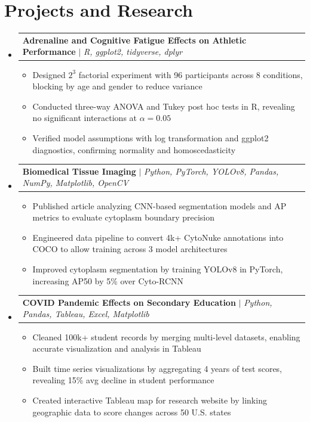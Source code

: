 \documentclass[letterpaper,11pt]{article}
\makeatletter
\newcommand{\resumeItem}[1]{\item\small{#1}}
\newcommand{\resumeProjectHeading}[2]{
    \item
    \begin{tabular*}{\textwidth}{l@{\extracolsep{\fill}}r}
      #1 & #2 \\
    \end{tabular*}\vspace{-7pt}
}
\newcommand{\resumeSubHeadingListStart}{\begin{itemize}[leftmargin=0in, label={}]}
\newcommand{\resumeSubHeadingListEnd}{\end{itemize}}
\newcommand{\resumeItemListStart}{\begin{itemize}[itemsep= 1.5pt, parsep=0pt]}
\newcommand{\resumeItemListEnd}{\end{itemize}\vspace{-5pt}}
\makeatother
\begin{document}
\section{Projects and Research}
    \resumeSubHeadingListStart
      \resumeProjectHeading
          {\textbf{Adrenaline and Cognitive Fatigue Effects on Athletic Performance} $|$ \textit{R, ggplot2, tidyverse, dplyr}}{}
          \resumeItemListStart
            \resumeItem{Designed $2^3$ factorial experiment with 96 participants across 8 conditions, blocking by age and gender to reduce variance}
            \resumeItem{Conducted three-way ANOVA and Tukey post hoc tests in R, revealing no significant interactions at $\alpha = 0.05$}
            \resumeItem{Verified model assumptions with log transformation and ggplot2 diagnostics, confirming normality and homoscedasticity}
          \resumeItemListEnd
      \resumeProjectHeading
          {\textbf{Biomedical Tissue Imaging} $|$ \textit{Python, PyTorch, YOLOv8, Pandas, NumPy, Matplotlib, OpenCV}}{}
          \resumeItemListStart
            \resumeItem{Published article analyzing CNN-based segmentation models and AP metrics to evaluate cytoplasm boundary precision}
            \resumeItem{Engineered data pipeline to convert 4k+ CytoNuke annotations into COCO to allow training across 3 model architectures}
            \resumeItem{Improved cytoplasm segmentation by training YOLOv8 in PyTorch, increasing AP50 by 5\% over Cyto-RCNN}
          \resumeItemListEnd
      \resumeProjectHeading
          {\textbf{COVID Pandemic Effects on Secondary Education} $|$ \textit{Python, Pandas, Tableau, Excel, Matplotlib}}{}
          \resumeItemListStart
            \resumeItem{Cleaned 100k+ student records by merging multi-level datasets, enabling accurate visualization and analysis in Tableau}
            \resumeItem{Built time series visualizations by aggregating 4 years of test scores, revealing 15\% avg decline in student performance}
            \resumeItem{Created interactive Tableau map for research website by linking geographic data to score changes across 50 U.S. states}
          \resumeItemListEnd
    \resumeSubHeadingListEnd
\end{document}
